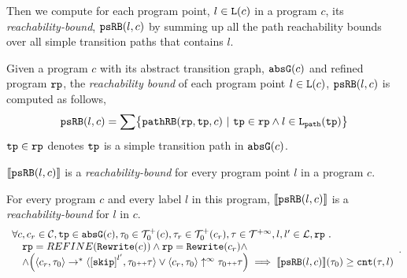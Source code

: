 Then we compute for each program point, $l \in \mathtt{L}(c)$ in a program $c$,
its \emph{reachability-bound}, $\mathtt{psRB}(l, c)$ by summing up all the path reachability bounds over all simple transition paths that contains $l$.
%
\begin{defn}
\label{def:point_psrb}
Given a program $c$ with its {abstract transition graph}, $\mathtt{abs}{\mathtt{G}}(c)$ and refined program $\mathtt{rp}$,
the \emph{reachability bound} of each program point $l \in \mathtt{L}(c)$, $\mathtt{psRB}(l, c)$  is computed as follows,
\[ 
  \psRB(l, c) = 
  \sum
  \left\{ \inoutB(\rprog, \tpath, c) ~\vert~ \tpath \in \rprog \land 
  l \in \pathl(\tpath) \right\}
\]
$\mathtt{tp} \in \mathtt{rp}$ denotes $\mathtt{tp}$ is a simple transition path in $\mathtt{abs}{\mathtt{G}}(c)$.
\end{defn}
$\llbracket \mathtt{psRB}(l, c) \rrbracket$ is a \emph{reachability-bound} for every program point $l$ in a program $c$.
\begin{thm}[Soundness]
\label{thm:pathsensitive_rb_soundness}
For every program ${c}$ and every label $l$ in this program,
$\llbracket \mathtt{psRB}(l, c) \rrbracket$ is a \emph{reachability-bound} for $l$ in $c$.
%
{\small
\[
  \begin{array}{l}
    \forall c, c_r \in \cdom, \tpath \in \absG(c), \trace_0 \in \ftdom_0(c),  \trace_r \in \ftdom_0(c_r), \trace \in \tdom, l, l' \in \ldom, \rprog \st 
    \\ \quad
    \rprog = REFINE(\algrewrite(c))
    \land 
    \rprog = \algrewrite(c_r)
    \land
    \\ \quad
    \land
    \Big(
    \config{c_r, \trace_0} \rightarrow^* \config{\clabel{\eskip}^{l'}, \trace_0 \tracecat \trace}
    \lor \config{c_r, \trace_0} \uparrow^{\infty} \trace_0 \tracecat \trace 
    \Big)
    \implies \econfig{\psRB(l, c)}(\trace_0) \geq \counter(\trace, l)
  \end{array}.
\]
}
\end{thm}